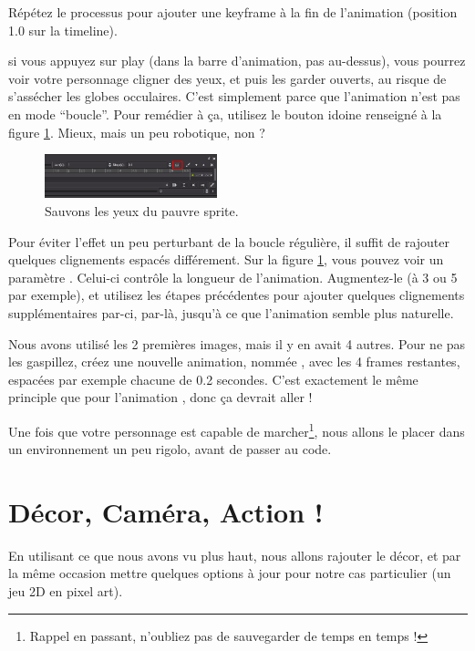Répétez le processus pour ajouter une keyframe à la fin de l'animation (position 1.0 sur la timeline).

si vous appuyez sur play (dans la barre d'animation, pas au-dessus), vous pourrez voir votre personnage cligner des yeux, et puis les garder ouverts, au risque de s'assécher les globes occulaires. C'est simplement parce que l'animation n'est pas en mode ``boucle''. Pour remédier à ça, utilisez le bouton idoine renseigné à la figure \ref{lvl1-animloop}. Mieux, mais un peu robotique, non ?

\begin{figure}
  \begin{center}
    \includegraphics[width=5cm]{img/lvl1-animloop.png}
  \end{center}
  \caption{\label{lvl1-animloop} Sauvons les yeux du pauvre sprite.}
\end{figure}

Pour éviter l'effet un peu perturbant de la boucle régulière, il suffit de rajouter quelques clignements espacés différement. Sur la figure \ref{lvl1-animloop}, vous pouvez voir un paramètre . Celui-ci contrôle la longueur de l'animation. Augmentez-le (à 3 ou 5 par exemple), et utilisez les étapes précédentes pour ajouter quelques clignements supplémentaires par-ci, par-là, jusqu'à ce que l'animation semble plus naturelle.

Nous avons utilisé les 2 premières images, mais il y en avait 4 autres. Pour ne pas les gaspillez, créez une nouvelle animation, nommée , avec les 4 frames restantes, espacées par exemple chacune de 0.2 secondes. C'est exactement le même principle que pour l'animation , donc ça devrait aller !

Une fois que votre personnage est capable de marcher\footnote{Rappel en passant, n'oubliez pas de sauvegarder de temps en temps !}, nous allons le placer dans un environnement un peu rigolo, avant de passer au code.

\section{Décor, Caméra, Action !}

En utilisant ce que nous avons vu plus haut, nous allons rajouter le décor, et par la même occasion mettre quelques options à jour pour notre cas particulier (un jeu 2D en pixel art).

